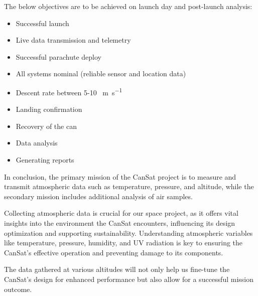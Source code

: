 The below objectives are to be achieved on launch day and post-launch analysis:
\begin{multicols}{2}[\vspace{-0.75\baselineskip}]
\begin{itemize}[leftmargin=1cm,itemindent=0.5cm, noitemsep, topsep=2pt, label=]
    \item Successful launch
    \item Live data transmission and  telemetry
    \item Successful parachute deploy
    \item All systems nominal (reliable sensor and location data)
    \item Descent rate between 5-10 \SI{}{\meter\per\second}
    \item Landing confirmation
    \item Recovery of the can
    \item Data analysis
    \item Generating reports
\end{itemize}
\end{multicols}

In conclusion, the primary mission of the CanSat project is to measure and transmit atmospheric data such as temperature, pressure, and altitude, while the secondary mission includes additional analysis of air samples.


Collecting atmospheric data is crucial for our space project, as it offers vital insights into the environment the CanSat encounters, influencing its design optimization and supporting sustainability. Understanding atmospheric variables like temperature, pressure, humidity, and UV radiation is key to ensuring the CanSat's effective operation and preventing damage to its components.

The data gathered at various altitudes will not only help us fine-tune the CanSat's design for enhanced performance but also allow for a successful mission outcome.